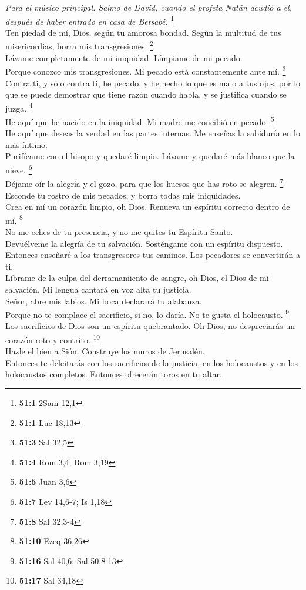 \emph{Para el músico principal. Salmo de David, cuando el profeta Natán
acudió a él, después de haber entrado en casa de Betsabé.} \footnote{\textbf{51:1}
  2Sam 12,1}\\
 Ten piedad de mí, Dios, según tu amorosa bondad. Según la
multitud de tus misericordias, borra mis transgresiones. \footnote{\textbf{51:1}
  Luc 18,13}\\
 Lávame completamente de mi iniquidad. Límpiame de mi
pecado.\\
 Porque conozco mis transgresiones. Mi pecado está
constantemente ante mí. \footnote{\textbf{51:3} Sal 32,5}\\
 Contra ti, y sólo contra ti, he pecado, y he hecho lo que
es malo a tus ojos, por lo que se puede demostrar que tiene razón cuando
habla, y se justifica cuando se juzga. \footnote{\textbf{51:4} Rom 3,4;
  Rom 3,19}\\
 He aquí que he nacido en la iniquidad. Mi madre me
concibió en pecado. \footnote{\textbf{51:5} Juan 3,6}\\
 He aquí que deseas la verdad en las partes internas. Me
enseñas la sabiduría en lo más íntimo.\\
 Purifícame con el hisopo y quedaré limpio. Lávame y
quedaré más blanco que la nieve. \footnote{\textbf{51:7} Lev 14,6-7; Is
  1,18}\\
 Déjame oír la alegría y el gozo, para que los huesos que
has roto se alegren. \footnote{\textbf{51:8} Sal 32,3-4}\\
 Esconde tu rostro de mis pecados, y borra todas mis
iniquidades.\\
 Crea en mí un corazón limpio, oh Dios. Renueva un
espíritu correcto dentro de mí. \footnote{\textbf{51:10} Ezeq 36,26}\\
 No me eches de tu presencia, y no me quites tu Espíritu
Santo.\\
 Devuélveme la alegría de tu salvación. Sosténgame con un
espíritu dispuesto.\\
 Entonces enseñaré a los transgresores tus caminos. Los
pecadores se convertirán a ti.\\
 Líbrame de la culpa del derramamiento de sangre, oh
Dios, el Dios de mi salvación. Mi lengua cantará en voz alta tu
justicia.\\
 Señor, abre mis labios. Mi boca declarará tu alabanza.\\
 Porque no te complace el sacrificio, si no, lo daría. No
te gusta el holocausto. \footnote{\textbf{51:16} Sal 40,6; Sal 50,8-13}\\
 Los sacrificios de Dios son un espíritu quebrantado. Oh
Dios, no despreciarás un corazón roto y contrito. \footnote{\textbf{51:17}
  Sal 34,18}\\
 Hazle el bien a Sión. Construye los muros de
Jerusalén.\\
 Entonces te deleitarás con los sacrificios de la
justicia, en los holocaustos y en los holocaustos completos. Entonces
ofrecerán toros en tu altar.

